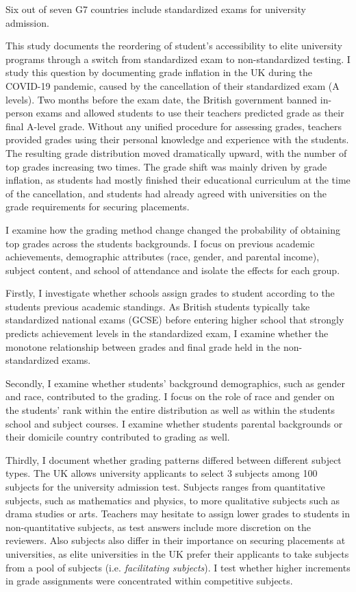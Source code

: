 Six out of seven G7 countries include standardized exams for university admission. 

This study documents the reordering of student's accessibility to elite university programs through a switch from standardized exam to non-standardized testing. I study this question by documenting grade inflation in the UK during the COVID-19 pandemic, caused by the cancellation of their standardized exam (A levels). Two months before the exam date, the British government banned in-person exams and allowed students to use their teachers predicted grade as their final A-level grade. Without any unified procedure for assessing grades, teachers provided grades using their personal knowledge and experience with the students. The resulting grade distribution moved dramatically upward, with the number of top grades increasing two times. The grade shift was mainly driven by grade inflation, as students had mostly finished their educational curriculum at the time of the cancellation, and students had already agreed with universities on the grade requirements for securing placements. 

I examine how the grading method change changed the probability of obtaining top grades across the students backgrounds. I focus on previous academic achievements, demographic attributes (race, gender, and parental income), subject content, and school of attendance and isolate the effects for each group. 

Firstly, I investigate whether schools assign grades to student according to the students previous academic standings. As British students typically take standardized national exams (GCSE) before entering higher school that strongly predicts achievement levels in the standardized exam, I examine whether the monotone relationship between grades and final grade held in the non-standardized exams. 

Secondly, I examine whether students' background demographics, such as gender and race, contributed to the grading. I focus on the role of race and gender on the students' rank within the entire distribution as well as within the students school and subject courses. I examine whether students parental backgrounds or their domicile country contributed to grading as well. 

Thirdly, I document whether grading patterns differed between different subject types. The UK allows university applicants to select 3 subjects among 100 subjects for the university admission test. Subjects ranges from quantitative subjects, such as mathematics and physics, to more qualitative subjects such as drama studies or arts. Teachers may hesitate to assign lower grades to students in non-quantitative subjects, as test answers include more discretion on the reviewers. Also subjects also differ in their importance on securing placements at universities, as elite universities in the UK prefer their applicants to take subjects from a pool of subjects (i.e. \emph{facilitating subjects}). I test whether higher increments in grade assignments were concentrated within competitive subjects. 

